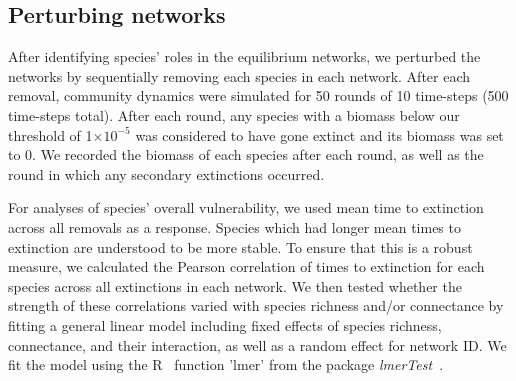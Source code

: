 \documentclass[12pt]{article}
\begin{document}


	\subsection*{Perturbing networks}

		After identifying species' roles in the equilibrium networks, we perturbed the networks by sequentially removing each species in each network. After each removal, community dynamics were simulated for 50 rounds of 10 time-steps (500 time-steps total). After each round, any species with a biomass below our threshold of 1$\times10^{-5}$ was considered to have gone extinct and its biomass was set to 0. We recorded the biomass of each species after each round, as well as the round in which any secondary extinctions occurred.


		For analyses of species' overall vulnerability, we used mean time to extinction across all removals as a response. Species which had longer mean times to extinction are understood to be more stable. To ensure that this is a robust measure, we calculated the Pearson correlation of times to extinction for each species across all extinctions in each network. We then tested whether the strength of these correlations varied with species richness and/or connectance by fitting a general linear model including fixed effects of species richness, connectance, and their interaction, as well as a random effect for network ID. We fit the model using the R~\citep{R} function 'lmer' from the package \emph{lmerTest}~\citep{lmerTest}.
\end{document}
